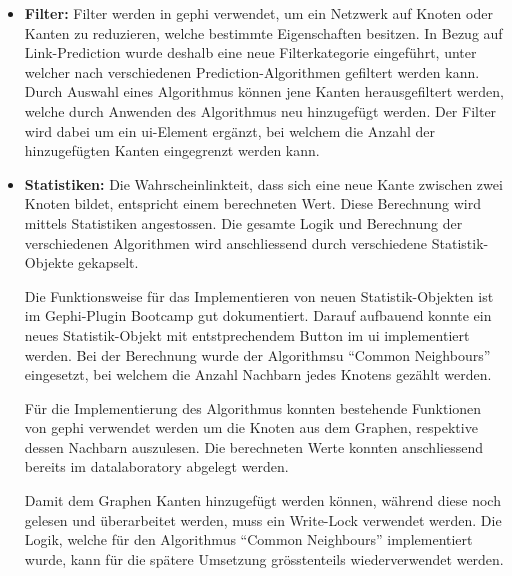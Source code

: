 \begin{itemize}
    \item \textbf{Filter:} Filter werden in \acs{gephi} verwendet, um ein Netzwerk auf Knoten oder Kanten zu reduzieren, welche bestimmte Eigenschaften besitzen.
    In Bezug auf Link-Prediction wurde deshalb eine neue Filterkategorie eingeführt, unter welcher nach verschiedenen Prediction-Algorithmen gefiltert werden kann.
    Durch Auswahl eines Algorithmus können jene Kanten herausgefiltert werden, welche durch Anwenden des Algorithmus neu hinzugefügt werden.
    Der Filter wird dabei um ein \acs{ui}-Element ergänzt, bei welchem die Anzahl der hinzugefügten Kanten eingegrenzt werden kann.

    \item \textbf{Statistiken:} Die Wahrscheinlinkteit, dass sich eine neue Kante zwischen zwei Knoten bildet, entspricht einem berechneten Wert.
    Diese Berechnung wird mittels Statistiken angestossen. Die gesamte Logik und Berechnung der verschiedenen Algorithmen wird anschliessend
    durch verschiedene Statistik-Objekte gekapselt.

    Die Funktionsweise für das Implementieren von neuen Statistik-Objekten ist im Gephi-Plugin Bootcamp gut dokumentiert. Darauf aufbauend
    konnte ein neues Statistik-Objekt mit entstprechendem Button im \acs{ui} implementiert werden. Bei der Berechnung wurde der Algorithmsu
    ``Common Neighbours'' eingesetzt, bei welchem die Anzahl Nachbarn jedes Knotens gezählt werden.

    Für die Implementierung des Algorithmus konnten bestehende Funktionen von \acs{gephi} verwendet werden um die Knoten aus dem Graphen, respektive
    dessen Nachbarn auszulesen. Die berechneten Werte konnten anschliessend bereits im \acs{datalaboratory} abgelegt werden.


    Damit dem Graphen Kanten hinzugefügt werden können, während diese noch gelesen und überarbeitet werden, muss ein Write-Lock
    verwendet werden. Die Logik, welche für den Algorithmus ``Common Neighbours'' implementiert wurde, kann für die spätere Umsetzung
    grösstenteils wiederverwendet werden.
\end{itemize}

